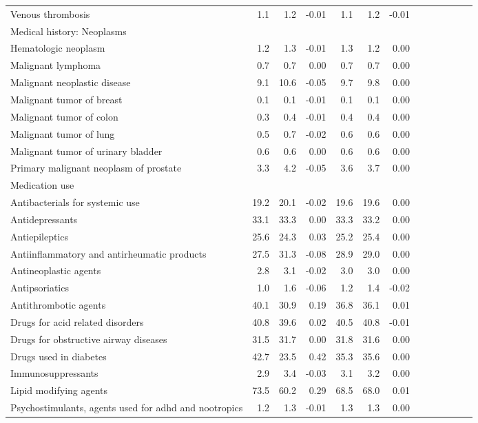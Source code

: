 \documentclass[11pt,]{article}
\begin{document}
\begin{longtable}{lrrrrrrrrrrrr}
      Venous thrombosis &  1.1 &  1.2 & -0.01 &  1.1 &  1.2 & -0.01 \\ 
  Medical history: Neoplasms &    &    &     &    &    &     \\ 
      Hematologic neoplasm &  1.2 &  1.3 & -0.01 &  1.3 &  1.2 &  0.00 \\ 
      Malignant lymphoma &  0.7 &  0.7 &  0.00 &  0.7 &  0.7 &  0.00 \\ 
      Malignant neoplastic disease &  9.1 & 10.6 & -0.05 &  9.7 &  9.8 &  0.00 \\ 
      Malignant tumor of breast &  0.1 &  0.1 & -0.01 &  0.1 &  0.1 &  0.00 \\ 
      Malignant tumor of colon &  0.3 &  0.4 & -0.01 &  0.4 &  0.4 &  0.00 \\ 
      Malignant tumor of lung &  0.5 &  0.7 & -0.02 &  0.6 &  0.6 &  0.00 \\ 
      Malignant tumor of urinary bladder &  0.6 &  0.6 &  0.00 &  0.6 &  0.6 &  0.00 \\ 
      Primary malignant neoplasm of prostate &  3.3 &  4.2 & -0.05 &  3.6 &  3.7 &  0.00 \\ 
  Medication use &    &    &     &    &    &     \\ 
      Antibacterials for systemic use & 19.2 & 20.1 & -0.02 & 19.6 & 19.6 &  0.00 \\ 
      Antidepressants & 33.1 & 33.3 &  0.00 & 33.3 & 33.2 &  0.00 \\ 
      Antiepileptics & 25.6 & 24.3 &  0.03 & 25.2 & 25.4 &  0.00 \\ 
      Antiinflammatory and antirheumatic products & 27.5 & 31.3 & -0.08 & 28.9 & 29.0 &  0.00 \\ 
      Antineoplastic agents &  2.8 &  3.1 & -0.02 &  3.0 &  3.0 &  0.00 \\ 
      Antipsoriatics &  1.0 &  1.6 & -0.06 &  1.2 &  1.4 & -0.02 \\ 
      Antithrombotic agents & 40.1 & 30.9 &  0.19 & 36.8 & 36.1 &  0.01 \\ 
      Drugs for acid related disorders & 40.8 & 39.6 &  0.02 & 40.5 & 40.8 & -0.01 \\ 
      Drugs for obstructive airway diseases & 31.5 & 31.7 &  0.00 & 31.8 & 31.6 &  0.00 \\ 
      Drugs used in diabetes & 42.7 & 23.5 &  0.42 & 35.3 & 35.6 &  0.00 \\ 
      Immunosuppressants &  2.9 &  3.4 & -0.03 &  3.1 &  3.2 &  0.00 \\ 
      Lipid modifying agents & 73.5 & 60.2 &  0.29 & 68.5 & 68.0 &  0.01 \\ 
      Psychostimulants, agents used for adhd and nootropics &  1.2 &  1.3 & -0.01 &  1.3 &  1.3 &  0.00 \\ 
   \bottomrule\end{longtable}
\end{document}
